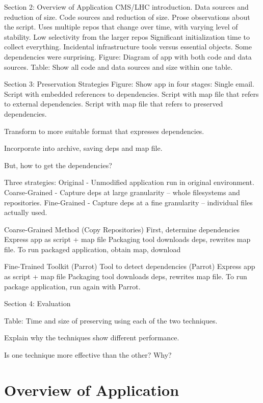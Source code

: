 \documentclass{acm_proc_article-sp}
\begin{document}
Section 2: Overview of Application
    CMS/LHC introduction.
    Data sources and reduction of size.
    Code sources and reduction of size.
    Prose observations about the script.
        Uses multiple repos that change over time, with varying level of stability.
        Low selectivity from the larger repos
        Significant initialization time to collect everything.
        Incidental infrastructure tools versus essential objects.
        Some dependencies were surprising.
    Figure: Diagram of app with both code and data sources.
    Table: Show all code and data sources and size within one table.

Section 3: Preservation Strategies
    Figure: Show app in four stages:
        Single email.
        Script with embedded references to dependencies.
        Script with map file that refers to external dependencies.
        Script with map file that refers to preserved dependencies.

    Transform to more suitable format that expresses dependencies.

    Incorporate into archive, saving deps and map file.

    But, how to get the dependencies?

    Three strategies:
        Original - Unmodified application run in original environment.
        Coarse-Grained - Capture deps at large granularity -- whole filesystems and repositories.
        Fine-Grained - Capture deps at a fine granularity -- individual files actually used.

    Coarse-Grained Method (Copy Repositories)
        First, determine dependencies
        Express app as script + map file
        Packaging tool downloads deps, rewrites map file.
        To run packaged application, obtain map, download

    Fine-Trained Toolkit (Parrot)
        Tool to detect dependencies (Parrot)
        Express app as script + map file
        Packaging tool downloads deps, rewrites map file.
        To run package application, run again with Parrot.

Section 4: Evaluation

    Table: Time and size of preserving using each of the two techniques.

    Explain why the techniques show different performance.

    Is one technique more effective than the other?  Why?
\fi

\section{Overview of Application}
\end{document}
